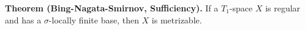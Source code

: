 \textbf{Theorem (Bing-Nagata-Smirnov, Sufficiency).} If a $T_1$-space $X$ is regular and has a $\sigma$-locally finite base, then $X$ is metrizable.
